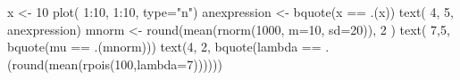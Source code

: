 \begin{Schunk}
\begin{Sinput}
 x <- 10
 plot( 1:10, 1:10, type="n")
 anexpression <-   bquote(x == .(x))
 text( 4, 5, anexpression)
 mnorm <- round(mean(rnorm(1000, m=10, sd=20)), 2 )
 text( 7,5, bquote(mu == .(mnorm)))
 text(4, 2, bquote(lambda == .(round(mean(rpois(100,lambda=7))))))
\end{Sinput}
\end{Schunk}
